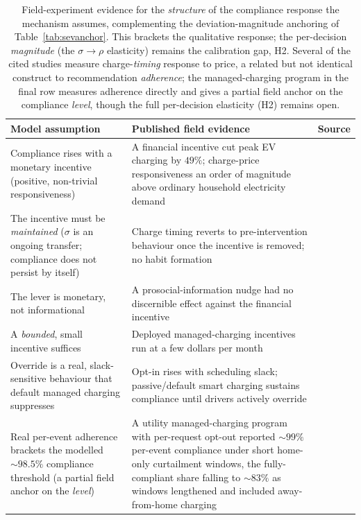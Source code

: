 \documentclass[12pt]{article}
\begin{document}
\begin{table}[t]
\centering
\caption{Field-experiment evidence for the \emph{structure} of the compliance response the mechanism assumes, complementing the deviation-magnitude anchoring of Table~\ref{tab:sevanchor}. This brackets the qualitative response; the per-decision \emph{magnitude} (the $\sigma\!\to\!\rho$ elasticity) remains the calibration gap, H2. Several of the cited studies measure charge-\emph{timing} response to price, a related but not identical construct to recommendation \emph{adherence}; the managed-charging program in the final row measures adherence directly and gives a partial field anchor on the compliance \emph{level}, though the full per-decision elasticity (H2) remains open.}
\label{tab:respanchor}
\begin{tabularx}{\textwidth}{p{}Xp{}}
\hline
Model assumption & Published field evidence & Source \\
\hline
Compliance rises with a monetary incentive (positive, non-trivial responsiveness) & A financial incentive cut peak EV charging by $49\%$; charge-price responsiveness an order of magnitude above ordinary household electricity demand & \cite{bailey2025fieldexp} \\
The incentive must be \emph{maintained} ($\sigma$ is an ongoing transfer; compliance does not persist by itself) & Charge timing reverts to pre-intervention behaviour once the incentive is removed; no habit formation & \cite{bailey2025fieldexp} \\
The lever is monetary, not informational & A prosocial-information nudge had no discernible effect against the financial incentive & \cite{bailey2025fieldexp} \\
A \emph{bounded}, small incentive suffices & Deployed managed-charging incentives run at a few dollars per month & \cite{alexeenko2023pilot} \\
Override is a real, slack-sensitive behaviour that default managed charging suppresses & Opt-in rises with scheduling slack; passive/default smart charging sustains compliance until drivers actively override & \cite{alexeenko2023pilot,dudek2021electricnation} \\
Real per-event adherence brackets the modelled ${\sim}98.5\%$ compliance threshold (a partial field anchor on the \emph{level}) & A utility managed-charging program with per-request opt-out reported ${\sim}99\%$ per-event compliance under short home-only curtailment windows, the fully-compliant share falling to ${\sim}83\%$ as windows lengthened and included away-from-home charging & \cite{bmwchargeforward} \\
\hline
\end{tabularx}
\end{table}
\end{document}
